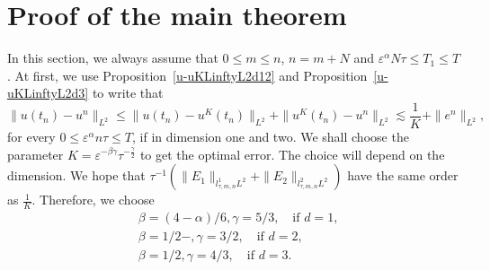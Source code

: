 \documentclass[10pt,a4paper]{article}
\begin{document}
  \section{Proof of the main theorem}\label{sec:proof-main}
  In this section, we always assume that \(0\leq m\leq n\), \(n=m+N\) and
  \(\varepsilon^\alpha N\tau \leq T_1 \leq T\). 
  At first, we use Proposition~\ref{u-uKLinftyL2d12} and
  Proposition~\ref{u-uKLinftyL2d3} to write that 
  \[ \| u(t_n) - u^n \|_{L^2} \leq \|u(t_n) - u^K(t_n)\|_{L^2} + \|u^K(t_n) - u^n\|_{L^2}
  \lesssim \frac1K + \|e^n\|_{L^2}, \]
  for every \( 0 \leq \varepsilon^\alpha n\tau \leq T\), if in dimension one and
  two.
  We shall choose the parameter \(K = \varepsilon^{-\beta\gamma} \tau^{-\frac\gamma2}\)
  to get the optimal error. The choice will depend on the dimension. 
  We hope that \(\tau^{-1}(\|E_1\|_{l^1_{\tau,m,n} L^2} + \|E_2\|_{l^2_{\tau,m,n} L^2})\)
  have the same order as \(\frac1K\). Therefore, we choose
  \begin{equation}\label{bg}
    \begin{aligned}
      & \beta = (4-\alpha)/6, \gamma = 5/3 ,\quad \text{if } d=1, \\ 
      & \beta = 1/2-, \gamma = 3/2, \quad \text{if } d=2, \\ 
      & \beta = 1/2, \gamma = 4/3, \quad \text{if } d=3. 
    \end{aligned}
  \end{equation}
\end{document}
